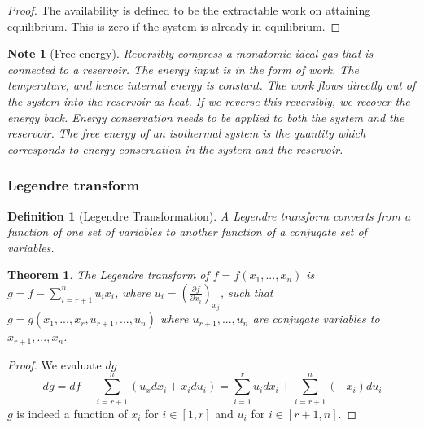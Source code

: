 \documentclass[a4paper]{article}
\newtheorem{Note}{Note}[section]
\theoremstyle{new}
\newtheorem{defi}{Definition}[section]
\newtheorem{thm}{Theorem}[section]
\begin{document}
\begin{proof}
The availability is defined to be the extractable work on attaining equilibrium. This is zero if the system is already in equilibrium.
\end{proof}
\begin{Note}[Free energy]
Reversibly compress a monatomic ideal gas that is connected to a reservoir. The energy input is in the form of work. The temperature, and hence internal energy is constant. The work flows directly out of the system into the reservoir as heat. If we reverse this reversibly, we recover the energy back. Energy conservation needs to be applied to both the system and the reservoir. The free energy of an isothermal system is the quantity which corresponds to energy conservation in the system and the reservoir.
\end{Note}
\subsubsection*{Legendre transform}
\begin{defi}[Legendre Transformation]
A Legendre transform converts from a function of one set of variables to another function of a conjugate set of variables. 
\end{defi}
\begin{thm}
The Legendre transform of $f=f(x_1,...,x_n)$ is $g=f-\sum_{i=r+1}^nu_ix_i$, where $u_i=(\frac{\partial f}{\partial x_i})_{x_j}$, such that $g=g(x_1,...,x_r,u_{r+1},...,u_n)$ where $u_{r+1},...,u_n$ are conjugate variables to $x_{r+1},...,x_n$.
\end{thm}
\begin{proof}
We evaluate $dg$
$$dg=df-\sum_{i=r+1}^n(u_xdx_i+x_idu_i)=\sum_{i=1}^ru_idx_i+\sum_{i=r+1}^n(-x_i)du_i$$
$g$ is indeed a function of $x_i$ for $i\in[1,r]$ and $u_i$ for $i\in[r+1,n]$.
\end{proof}
\end{document}
